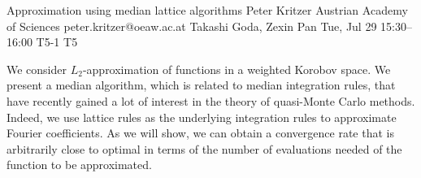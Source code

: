 \begin{talk}
  {Approximation using median lattice algorithms}%
  {Peter Kritzer}%
  {Austrian Academy of Sciences}%
  {peter.kritzer@oeaw.ac.at}%
  {Takashi Goda, Zexin Pan}%
  {}%
  {Tue, Jul 29 15:30--16:00}%
  {T5-1}%
  {T5}%
  
    
   
We consider $L_2$-approximation of functions in a weighted Korobov space. We present a median algorithm, which is related to median integration rules, that have recently gained a lot of interest in the theory of quasi-Monte Carlo methods. Indeed, we use lattice rules as the underlying integration rules to approximate Fourier coefficients. As we will show, we can obtain a convergence rate that is arbitrarily close to optimal in terms of the number of evaluations needed of the function to be approximated.
\end{talk}

